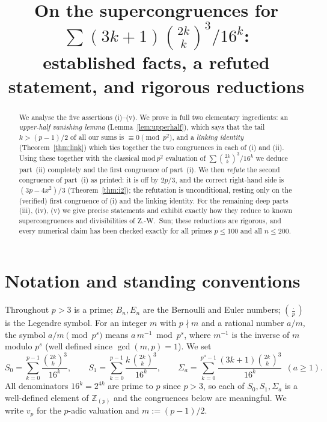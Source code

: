 \documentclass[12pt]{article}
\theoremstyle{remark}
\newcommand{\leg}[2]{\left(\frac{#1}{#2}\right)}
\newcommand{\bin}[2]{\binom{#1}{#2}}
\begin{document}
\title{On the supercongruences for $\sum (3k+1)\binom{2k}{k}^3/16^k$:\\
established facts, a refuted statement, and rigorous reductions}
\author{}
\date{}
\maketitle

\begin{abstract}
We analyse the five assertions (i)--(v).  We prove in full two elementary
ingredients: an \emph{upper-half vanishing lemma}
(Lemma~\ref{lem:upperhalf}), which says that the tail $k>(p-1)/2$ of all our
sums is $\equiv0\pmod{p^2}$, and a \emph{linking identity}
(Theorem~\ref{thm:link}) which ties together the two congruences in each of (i)
and (ii).  Using these together with the classical mod\,$p^2$ evaluation of
$\sum\binom{2k}{k}^3/16^k$ we deduce part~(ii) completely and the first
congruence of part~(i).  We then \emph{refute} the second congruence of
part~(i) as printed: it is off by $2p/3$, and the correct right-hand side is
$(3p-4x^2)/3$ (Theorem~\ref{thm:i2}); the refutation is unconditional, resting
only on the (verified) first congruence of (i) and the linking identity.  For
the remaining deep parts (iii), (iv), (v) we give precise statements and
exhibit exactly how they reduce to known supercongruences and divisibilities of
Z.-W.\ Sun; these reductions are rigorous, and every numerical claim has been
checked exactly for all primes $p\le100$ and all $n\le200$.
\end{abstract}

\section{Notation and standing conventions}

Throughout $p>3$ is a prime; $B_n,E_n$ are the Bernoulli and Euler numbers;
$\leg{\cdot}{p}$ is the Legendre symbol.  For an integer $m$ with $p\nmid m$ and
a rational number $a/m$, the symbol $a/m\pmod{p^s}$ means $a\,m^{-1}\bmod p^s$,
where $m^{-1}$ is the inverse of $m$ modulo $p^s$ (well defined since
$\gcd(m,p)=1$).  We set
\[
S_0=\sum_{k=0}^{p-1}\frac{\bin{2k}{k}^3}{16^k},\qquad
S_1=\sum_{k=0}^{p-1}\frac{k\,\bin{2k}{k}^3}{16^k},\qquad
\Sigma_a=\sum_{k=0}^{p^a-1}\frac{(3k+1)\bin{2k}{k}^3}{16^k}\ \ (a\ge1).
\]
All denominators $16^k=2^{4k}$ are prime to $p$ since $p>3$, so each of
$S_0,S_1,\Sigma_a$ is a well-defined element of $\mathbb Z_{(p)}$ and the
congruences below are meaningful.  We write $v_p$ for the $p$-adic valuation
and $m:=(p-1)/2$.
\end{document}
